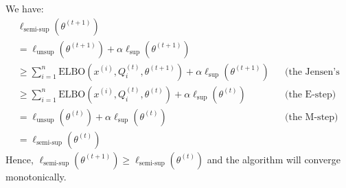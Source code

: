 \begin{answer}
We have:
\begin{align}
	&\ell_{\text{semi-sup}}(\theta^{(t+1)}) \\
	&= \ell_{\text{unsup}}(\theta^{(t+1)}) + \alpha \ell_{\text{sup}}(\theta^{(t+1)}) \\
	& \ge \sum_{i=1}^{n} \text{ELBO}(x^{(i)}, Q_i^{(t)}, \theta^{(t+1)}) + \alpha \ell_{\text{sup}}(\theta^{(t+1)}) && \text{(the Jensen's inequality)} \\
	& \ge \sum_{i=1}^{n} \text{ELBO}(x^{(i)}, Q_i^{(t)}, \theta^{(t)}) + \alpha \ell_{\text{sup}}(\theta^{(t)}) && \text{(the E-step)}\\
	&= \ell_{\text{unsup}}(\theta^{(t)}) + \alpha \ell_{\text{sup}}(\theta^{(t)}) && \text{(the M-step)} \\
	&= \ell_{\text{semi-sup}}(\theta^{(t)}) 
\end{align}
Hence, $\ell_\text{semi-sup}(\theta^{(t+1)}) \ge \ell_\text{semi-sup}(\theta^{(t)})$ and the algorithm will converge monotonically.
\end{answer}
